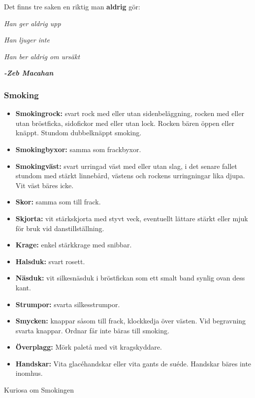     Det finns tre saken en riktig man \textbf{aldrig} gör:

    \textit{Han ger aldrig upp}
    
    \textit{Han ljuger inte}
    
    \textit{Han ber aldrig om ursäkt}
    
    \textit{\textbf{-Zeb Macahan}} 

    \subsubsection{\textbf{Smoking}}

    \begin{itemize}
        
        \item[]\textbf{Smokingrock:} svart rock med eller utan sidenbeläggning, rocken med eller utan bröstficka, sidofickor med eller utan lock. Rocken bären öppen eller knäppt. Stundom dubbelknäppt smoking.
        
        \item[]\textbf{Smokingbyxor:} samma som frackbyxor.
        
        \item[]\textbf{Smokingväst:} svart urringad väst med eller utan slag, i det senare fallet stundom med stärkt linnebård, västens och rockens urringningar lika djupa. Vit väst bäres icke.
        
        \item[]\textbf{Skor:} samma som till frack.
        
        \item[]\textbf{Skjorta:} vit stärkskjorta med styvt veck, eventuellt lättare stärkt eller mjuk för bruk vid danstillställning.
        
        \item[]\textbf{Krage:} enkel stärkkrage med snibbar.
        
        \item[]\textbf{Halsduk:} svart rosett.
        
        \item[]\textbf{Näsduk:} vit silkesnäsduk i bröstfickan som ett smalt band synlig ovan dess kant.
        
        \item[]\textbf{Strumpor:} svarta silkesstrumpor.
        
        \item[]\textbf{Smycken:} knappar såsom till frack, klockkedja över västen. Vid begravning svarta knappar. Ordnar får inte bäras till smoking.
        
        \item[]\textbf{Överplagg:} Mörk paletå med vit kragskyddare.
        
        \item[]\textbf{Handskar:} Vita glacéhandskar eller vita gants de suéde. Handskar bäres inte inomhus.
        
    \end{itemize}
    Kuriosa om Smokingen

